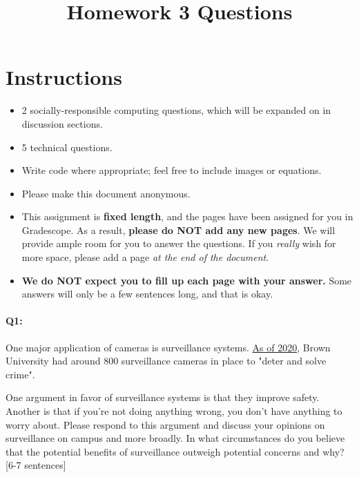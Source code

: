 \date{}

\title{\vspace{-1cm}Homework 3 Questions}



\maketitle
\vspace{-2cm}
\thispagestyle{fancy}

\section*{Instructions}
\begin{itemize}
  \item 2 socially-responsible computing questions, which will be expanded on in discussion sections.
  \item 5 technical questions.
  \item Write code where appropriate; feel free to include images or equations.
  \item Please make this document anonymous.
  \item This assignment is \textbf{fixed length}, and the pages have been assigned for you in Gradescope. As a result, \textbf{please do NOT add any new pages}. We will provide ample room for you to answer the questions. If you \emph{really} wish for more space, please add a page \emph{at the end of the document}.
  \item \textbf{We do NOT expect you to fill up each page with your answer.} Some answers will only be a few sentences long, and that is okay.
\end{itemize}



\pagebreak 
\paragraph{Q1:} One major application of cameras is surveillance systems. \href{https://www.browndailyherald.com/article/2020/02/cameras-installed-in-hegeman-hall}{As of 2020}, Brown University had around 800 surveillance cameras in place to "deter and solve crime". 

One argument in favor of surveillance systems is that they improve safety. Another is that if you're not doing anything wrong, you don't have anything to worry about. Please respond to this argument and discuss your opinions on surveillance on campus and more broadly. In what circumstances do you believe that the potential benefits of surveillance outweigh potential concerns and why? [6-7 sentences]

